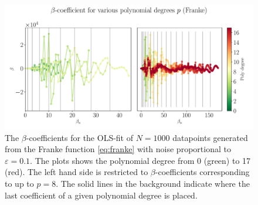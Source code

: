 \documentclass[%
reprint,
amsmath,amssymb,
aps,
pra,
]{revtex4-2}
\begin{document}
\begin{figure}[H]
	\hspace{-7.5mm}
	\includegraphics[width=1.15\linewidth]{Python/Figures/OLS/OLS_betano_scaling_1000.pdf}
	\caption{The \(\beta\)-coefficients for the OLS-fit of \(N=1000\) datapoints generated from the Franke function \eqref{eq:franke} with noise proportional to \(\varepsilon=0.1\). The plots shows the polynomial degree from 0 (green) to 17 (red). The left hand side is restricted to \(\beta\)-coefficients corresponding to up to \(p=8\). The solid lines in the background indicate where the last coefficient of a given polynomial degree is placed.}
	\label{fig:OLS_beta_degree_1000}
\end{figure}
\end{document}
